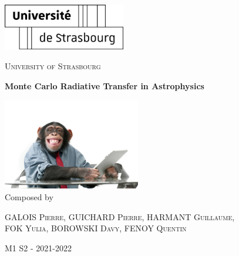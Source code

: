 \documentclass[10pt,a4paper,oneside]{article}
\begin{document}
\begin{titlepage}
	\centering
	\includegraphics[width=0.4\textwidth]{SCHEMA/unistra.png}\par\vspace{1cm}
	{\scshape\LARGE University of Strasbourg\par}
	\vspace{1.5cm}
	{\huge\bfseries Monte Carlo Radiative Transfer in Astrophysics\\
	\par}
	\vspace{1cm}
            \includegraphics[width=0.45\textwidth]{SCHEMA/grover_2.jpeg} \\

	\vspace{2cm}
	\vfill
	Composed by\par
	\textsc{GALOIS Pierre, GUICHARD Pierre, HARMANT Guillaume, \\
	FOK Yulia, BOROWSKI Davy, FENOY Quentin}

	\vfill

	{\large M1 S2 - 2021-2022 \par}
\end{titlepage}

\tableofcontents
\listoffigures
\newpage 
\end{document}
